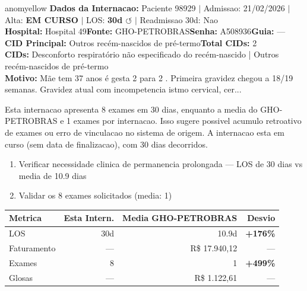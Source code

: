\documentclass[a4paper,10pt]{article}
\begin{document}
\begin{anomalycard}[Internacao 166118 | GHO-PETROBRAS | MODERADO (z=2.34)]{anomyellow}
\textbf{Dados da Internacao:} Paciente 98929 $\mid$ Admissao: 21/02/2026 $\mid$ Alta: \textcolor{anomorange}{\textbf{EM CURSO}} $\mid$ LOS: \textbf{30d \textcolor{anomorange}{$\circlearrowleft$}} $\mid$ Readmissao 30d: Nao\\
\textbf{Hospital:} Hospital 49\quad\textbf{Fonte:} GHO-PETROBRAS\quad\textbf{Senha:} A508936\quad\textbf{Guia:} ---\\
\textbf{CID Principal:} {\small Outros recém-nascidos de pré-termo}\quad\textbf{Total CIDs:} 2\\

\textbf{CIDs:} {\scriptsize Desconforto respiratório não especificado do recém-nascido | Outros recém-nascidos de pré-termo}\\

\textbf{Motivo:} {\scriptsize Mãe tem 37 anos é gesta 2 para 2 . Primeira gravidez  chegou a 18/19 semanas. Gravidez atual com incompetencia istmo cervical, cer...}\\

\vspace{2pt}\begin{tcolorbox}[colback=severityred!20,colframe=anomyellow,title={\textbf{Interpretacao de Negocio}},fonttitle=\bfseries\small,left=4pt,right=4pt,top=3pt,bottom=3pt]
{\small Esta internacao apresenta 8 exames em 30 dias, enquanto a media do GHO-PETROBRAS e 1 exames por internacao. Isso sugere possivel acumulo retroativo de exames ou erro de vinculacao no sistema de origem. A internacao esta em curso (sem data de finalizacao), com 30 dias decorridos.}
\end{tcolorbox}
\begin{tcolorbox}[colback=severityyellow!30,colframe=anomorange,title={\textbf{Recomendacoes Especificas}},fonttitle=\bfseries\small,left=4pt,right=4pt,top=3pt,bottom=3pt]
\begin{enumerate}[nosep,leftmargin=16pt]
\item {\small Verificar necessidade clinica de permanencia prolongada --- LOS de 30 dias vs media de 10.9 dias}
\item {\small Validar os 8 exames solicitados (media: 1)}
\end{enumerate}
\end{tcolorbox}
\begin{center}\begin{tabular}{l r r r}\toprule\textbf{Metrica} & \textbf{Esta Intern.} & \textbf{Media GHO-PETROBRAS} & \textbf{Desvio} \\\midrule
LOS & 30d & 10.9d & \textcolor{anomred}{\textbf{+176\%}} \\
Faturamento & --- & R\$ 17.940,12 & --- \\
Exames & 8 & 1 & \textcolor{anomred}{\textbf{+499\%}} \\
Glosas & --- & R\$ 1.122,61 & --- \\
\bottomrule\end{tabular}\end{center}


\end{anomalycard}
\end{document}
